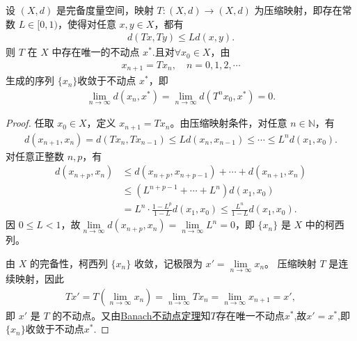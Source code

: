 \documentclass[../../main.tex]{subfiles}%
\begin{document}
\begin{corollary}\label{corollary:压缩映射迭代收敛性质}
设 $(X, d)$ 是完备度量空间，映射 $T: (X,d) \to (X,d)$ 为压缩映射，即存在常数 $L \in [0, 1)$，使得对任意 $x, y \in X$，都有
\begin{align*}
d(Tx, Ty) \leqslant L d(x, y).
\end{align*}
则 $T$ 在 $X$ 中存在唯一的不动点 $x^*$.且对$\forall x_0 \in X$，由
\begin{align*}
x_{n+1} = Tx_n,\quad n=0,1,2,\cdots
\end{align*}
生成的序列 $\{x_n\}$收敛于不动点 $x^*$，即
\begin{align*}
\lim_{n \to \infty} d(x_n, x^*) =\lim_{n \to \infty} d(T^nx_0, x^*) =0.
\end{align*}
\end{corollary}
\begin{proof}

任取 $x_0 \in X$，定义 $x_{n+1}=Tx_n$。由压缩映射条件，对任意 $n \in \mathbb{N}$，有
\begin{align*}
d(x_{n+1}, x_n) = d(Tx_n, Tx_{n-1}) \leqslant L d(x_n, x_{n-1}) \leqslant \cdots \leqslant L^n d(x_1, x_0).
\end{align*}
对任意正整数 $n, p$，有
\begin{align*}
d(x_{n+p}, x_n) &\leqslant d(x_{n+p}, x_{n+p-1}) + \cdots + d(x_{n+1}, x_n) \\
&\leqslant \left(L^{n+p-1} + \cdots + L^n\right) d(x_1, x_0) \\
&= L^n \cdot \frac{1-L^p}{1-L} d(x_1, x_0) \leqslant \frac{L^n}{1-L} d(x_1, x_0).
\end{align*}
因 $0 \leqslant L < 1$，故$\lim\limits_{n \to \infty}d(x_{n+p}, x_n)=\lim\limits_{n \to \infty} L^n = 0$，即 $\{x_n\}$ 是 $X$ 中的柯西列。

由 $X$ 的完备性，柯西列 $\{x_n\}$ 收敛，记极限为 $x' = \lim\limits_{n \to \infty} x_n$。
压缩映射 $T$ 是连续映射，因此
\begin{align*}
Tx' = T\left(\lim_{n \to \infty} x_n\right) = \lim_{n \to \infty} Tx_n = \lim_{n \to \infty} x_{n+1} = x',
\end{align*}
即 $x'$ 是 $T$ 的不动点。又由\hyperref[theorem:Banach不动点定理——压缩映象原理]{Banach不动点定理}知$T$存在唯一不动点$x^*$,故$x'=x^*$,即$\{x_n\}$收敛于不动点$x^*$.

\end{proof}
\end{document}
